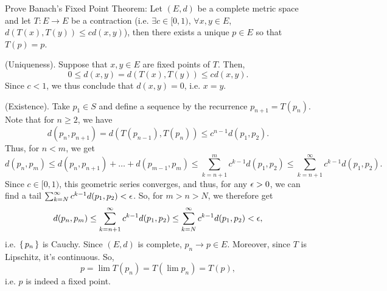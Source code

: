 \documentclass{article}
\begin{document}
\begin{problem}
Prove Banach's Fixed Point Theorem:
Let $(E, d)$ be a complete metric space and let $T : E \to E$ be a contraction (i.e. $\exists c \in [0, 1)$, $\forall x, y \in E$, $d(T(x), T(y)) \le c d(x, y)$), then there exists a unique $p \in E$ so that $T(p) = p$.
\begin{solution}
	(Uniqueness).
	Suppose that $x, y \in E$ are fixed points of $T$.
	Then,
	\[
		0 \le d(x, y) = d(T(x), T(y)) \le c d(x, y).
	\]
	Since $c < 1$, we thus conclude that $d(x, y) = 0$, i.e. $x = y$.

	(Existence).
	Take $p_1 \in S$ and define a sequence by the recurrence $p_{n + 1} = T(p_n)$.
	Note that for $n \ge 2$, we have
	\[
		d(p_n, p_{n + 1}) = d(T(p_{n - 1}), T(p_n)) \le c^{n - 1} d(p_1, p_2).
	\]
	Thus, for $n < m$, we get
	\[
		d(p_n, p_m) \le d(p_n, p_{n + 1}) + \dots + d(p_{m - 1}, p_m) \le \sum_{k = n + 1}^{m} c^{k - 1} d(p_1, p_2) \le \sum_{k = n + 1}^\infty c^{k - 1} d(p_1, p_2).
	\]
	Since $c \in [0, 1)$, this geometric series converges, and thus, for any $\epsilon > 0$, we can find a tail $\sum_{k = N}^\infty c^{k - 1} d(p_1, p_2) < \epsilon$.
	So, for $ m > n > N$, we therefore get
	\[
		d(p_n, p_m) \le \sum_{k = n + 1}^\infty c^{k - 1} d(p_1, p_2) \le \sum_{k = N}^\infty c^{k - 1} d(p_1, p_2) < \epsilon,
	\]
	i.e. $\set{ p_n }$ is Cauchy.
	Since $(E, d)$ is complete, $p_n \to p \in E$.
	Moreover, since $T$ is Lipschitz, it's continuous.
	So,
	\[
		p = \lim T(p_n) = T(\lim p_n) = T(p),
	\]
	i.e. $p$ is indeed a fixed point.
\end{solution}
\end{problem}
\end{document}
